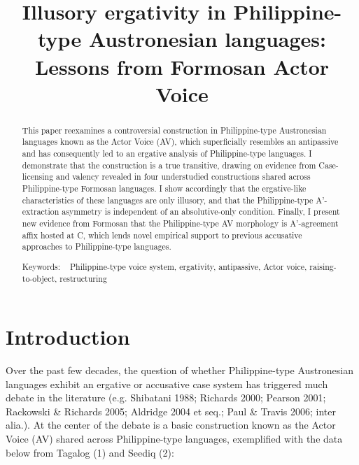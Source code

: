 \documentclass[10pt]{article}
\title{\vspace{-1.2cm}\textbf{Illusory ergativity in Philippine-type Austronesian languages: Lessons from Formosan Actor Voice \vspace{-2.6em}}}
\author{}
\date{}
\renewcommand{\baselinestretch}{1.08}
\newcommand\keywordslabel{Keywords: }
\newcommand\keywords[1]{%
  \begin{list}{}{%
    \setlength{\topsep}{2ex}%
    \settowidth{\leftmargin}{\keywordslabel~}%
    \setlength{\labelsep}{0pt}%
    \setlength{\labelwidth}{\leftmargin}%
    \setlength{\itemindent}{0pt}%
  }
  \raggedright\item[\keywordslabel~]#1
  \end{list}
}
\begin{document}
\maketitle

\renewcommand{\abstractname}{\vspace{-\baselineskip}}

\begin{abstract}
\renewcommand{\baselinestretch}{1.1}
\setlength{\parskip}{0.1cm plus2mm minus2mm}

\noindent This paper reexamines a controversial construction in Philippine-type Austronesian languages known as the Actor Voice (AV), which superficially resembles an antipassive and has consequently led to an ergative analysis of Philippine-type languages. I demonstrate that the construction is a true transitive, drawing on evidence from Case-licensing and valency revealed in four understudied constructions shared across Philippine-type Formosan languages. I show accordingly that the ergative-like characteristics of these languages are only illusory, and that the Philippine-type A'-extraction asymmetry is independent of an absolutive-only condition. Finally, I present new evidence from Formosan  that the Philippine-type AV morphology is A'-agreement affix hosted at C, which lends novel empirical support to previous accusative approaches to Philippine-type languages. 



\keywords{Philippine-type voice system, ergativity, antipassive, Actor voice, raising-to-object, restructuring}

\end{abstract}


\section{Introduction}
\vspace{-1.6mm}
\noindent
Over the past few decades, the question of whether Philippine-type Austronesian languages exhibit an ergative or accusative case system has triggered much debate in the literature (e.g. Shibatani 1988; Richards 2000; Pearson 2001; Rackowski \& Richards 2005; Aldridge 2004 et seq.; Paul \& Travis 2006; inter alia.). At the center of the debate is a basic construction known as the Actor Voice (AV) shared across Philippine-type languages, exemplified with the data below from Tagalog (1) and Seediq (2):
\end{document}

